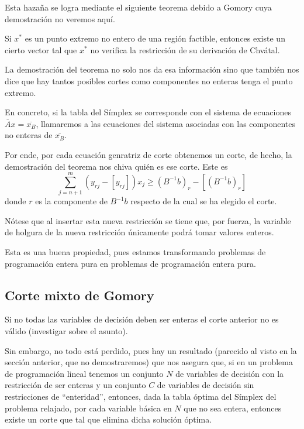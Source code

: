 Esta hazaña se logra mediante el siguiente teorema debido a Gomory cuya demostración no veremos aquí.
\begin{theo}[Gomory]
	Si $x^*$ es un punto extremo no entero de una región factible, entonces existe un cierto vector tal que $x^*$ no verifica la restricción de su derivación de Chvátal. 
\end{theo}
La demostración del teorema no solo nos da esa información sino que también nos dice que hay tantos posibles cortes como componentes no enteras tenga el punto extremo.

En concreto, si la tabla del Símplex se corresponde con el sistema de ecuaciones $\overline{A}x=\overline{x_B}$, llamaremos  a las ecuaciones del sistema asociadas con las componentes no enteras de $\overline{x_B}$.

Por ende, por cada ecuación genratriz de corte obtenemos un corte, de hecho, la demostración del teorema nos chiva quién es ese corte. Este es
\begin{equation*}
	\sum_{j=n+1}^{m}(y_{rj}-[y_{rj}])x_j\geq (B^{-1}b)_r-[(B^{-1}b)_r]
\end{equation*}
donde $r$ es la componente de $B^{-1}b$ respecto de la cual se ha elegido el corte.
\begin{obs}
	Nótese que al insertar esta nueva restricción se tiene que, por fuerza, la variable de holgura de la nueva restricción únicamente podrá tomar valores enteros.
	
	Esta es una buena propiedad, pues estamos transformando problemas de programación entera pura en problemas de programación entera pura.
\end{obs}
\subsection{Corte mixto de Gomory}
Si no todas las variables de decisión deben ser enteras el corte anterior no es válido (investigar sobre el asunto).

Sin embargo, no todo está perdido, pues hay un resultado (parecido al visto en la sección anterior, que no demostraremos) que nos asegura que, si en un problema de programación lineal tenemos un conjunto $N$ de variables de decisión con la restricción de ser enteras y un conjunto $C$ de variables de decisión sin restricciones de ``enteridad'', entonces, dada la tabla óptima del Símplex del problema relajado, por cada variable básica en $N$ que no sea entera, entonces existe un corte que tal que elimina dicha solución óptima.

